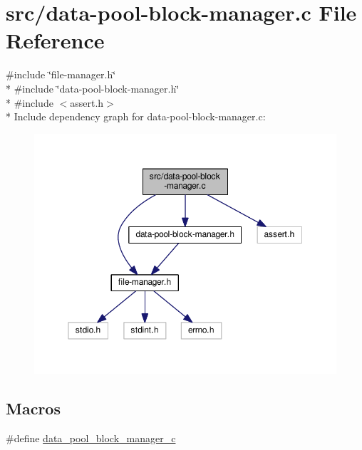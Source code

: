 \hypertarget{data-pool-block-manager_8c}{\section{src/data-\/pool-\/block-\/manager.c File Reference}
\label{data-pool-block-manager_8c}
}
{\ttfamily \#include \char`\"{}file-\/manager.\-h\char`\"{}}\\*
{\ttfamily \#include \char`\"{}data-\/pool-\/block-\/manager.\-h\char`\"{}}\\*
{\ttfamily \#include $<$assert.\-h$>$}\\*
Include dependency graph for data-\/pool-\/block-\/manager.c\-:
\nopagebreak
\begin{figure}[H]
\begin{center}
\leavevmode
\includegraphics[width=350pt]{data-pool-block-manager_8c__incl}
\end{center}
\end{figure}
\subsection*{Macros}
\begin{DoxyCompactItemize}
\item 
\#define \hyperlink{data-pool-block-manager_8c_acc334690346a1892e11c892ed27f70e7}{data\-\_\-pool\-\_\-block\-\_\-manager\-\_\-c}
\end{DoxyCompactItemize}
